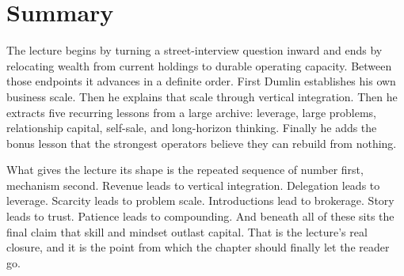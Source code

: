\section{Summary}

The lecture begins by turning a street-interview question inward and ends by relocating wealth from current holdings to durable operating capacity. Between those endpoints it advances in a definite order. First Dumlin establishes his own business scale. Then he explains that scale through vertical integration. Then he extracts five recurring lessons from a large archive: leverage, large problems, relationship capital, self-sale, and long-horizon thinking. Finally he adds the bonus lesson that the strongest operators believe they can rebuild from nothing.

What gives the lecture its shape is the repeated sequence of number first, mechanism second. Revenue leads to vertical integration. Delegation leads to leverage. Scarcity leads to problem scale. Introductions lead to brokerage. Story leads to trust. Patience leads to compounding. And beneath all of these sits the final claim that skill and mindset outlast capital. That is the lecture's real closure, and it is the point from which the chapter should finally let the reader go.